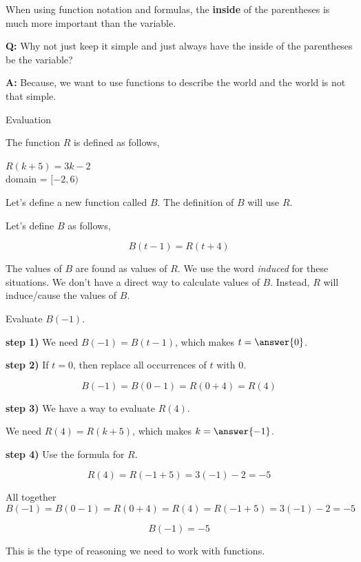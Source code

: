 \documentclass{ximera}
\begin{document}
When using function notation and formulas, the \textbf{inside} of the parentheses is much more important than the variable. 



\textbf{Q:} Why not just keep it simple and just always have the inside of the parentheses be the variable? 

\textbf{A:} Because, we want to use functions to describe the world and the world is not that simple. 




\begin{example} Evaluation


The function $R$ is defined as follows,

$R(k + 5) = 3k - 2$ \\
domain = $[-2, 6)$ 


Let's define a new function called $B$.  The definition of $B$ will use $R$. 



Let's define $B$ as follows,

\[ 
B(t - 1) = R(t + 4)
\]

The values of $B$ are found as values of $R$.  We use the word \textit{induced} for these situations.  We don't have a direct way to calculate values of $B$.  Instead, $R$ will induce/cause the values of $B$. 


\begin{question}

Evaluate $B(-1)$. 


\textbf{step 1)}  We need $B(-1) = B(t - 1)$, which makes $t = \answer{0}$. 


\textbf{step 2)}  If $t = 0$, then replace all occurrences of $t$ with $0$. 

\[
B(-1) = B(0 - 1) = R(0 + 4) = R(4)
\]


\textbf{step 3)} We have a way to evaluate $R(4)$.


We need $R(4) = R(k + 5)$, which makes $k = \answer{-1}$. 


\textbf{step 4)} Use the formula for $R$.

\[
R(4) = R(-1 + 5) = 3(-1) - 2 = -5
\]


All together \\



\[
B(-1) = B(0 - 1) = R(0 + 4) = R(4) = R(-1 + 5) = 3(-1) - 2 = -5
\]


\[
B(-1) = -5
\]

\end{question}


This is the type of reasoning we need to work with functions. 




\end{example}
\end{document}
